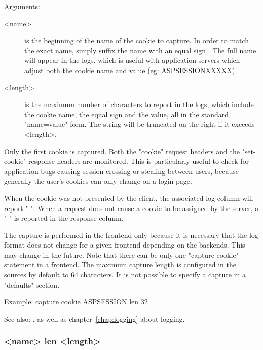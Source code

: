   Arguments:
  \begin{description} 
  \item[<name>]    is the beginning of the name of the cookie to capture. In order
              to match the exact name, simply suffix the name with an equal
              sign \chr{=}. The full name will appear in the logs, which is
              useful with application servers which adjust both the cookie name
              and value (eg: ASPSESSIONXXXXX).

  \item[<length>]  is the maximum number of characters to report in the logs, which
              include the cookie name, the equal sign and the value, all in the
              standard "name=value" form. The string will be truncated on the
              right if it exceeds <length>.
  \end{description}

  Only the first cookie is captured. Both the "cookie" request headers and the
  "set-cookie" response headers are monitored. This is particularly useful to
  check for application bugs causing session crossing or stealing between
  users, because generally the user's cookies can only change on a login page.

  When the cookie was not presented by the client, the associated log column
  will report "-". When a request does not cause a cookie to be assigned by the
  server, a "-" is reported in the response column.

  The capture is performed in the frontend only because it is necessary that
  the log format does not change for a given frontend depending on the
  backends. This may change in the future. Note that there can be only one
  "capture cookie" statement in a frontend. The maximum capture length is
  configured in the sources by default to 64 characters. It is not possible to
  specify a capture in a "defaults" section.

  \begin{example}{Example:}
  capture cookie ASPSESSION len 32
  \end{example}
  

See also: ,  as well as
            chapter~\ref{chap:logging} about logging.

\subsubsection[capture request header]{ <name> len <length>}
  
